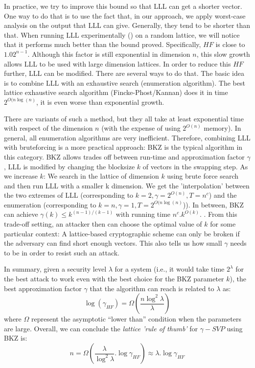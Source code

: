 In practice, we try to improve this bound so that LLL can get a shorter vector. One way
to do that is to use the fact that, in our approach, we apply worst-case analysis
on the output that LLL can give. Generally, they tend to be shorter than
that. When running LLL experimentally (\cite{nguyen2006lll}) on a random lattice, we
will notice that it performs much better than the bound proved. Specifically, $HF$
is close to $1.02^{n-1}$. Although this factor is still exponential in dimension
$n$, this slow growth allows LLL to be used with large dimension lattices. In
order to reduce this $HF$ further, LLL can be modified. There are several
ways to do that. The basic idea is to combine LLL with an exhaustive search
(enumeration algorithm). The best lattice exhaustive search algorithm
(Fincke-Phost/Kannan) does it in time $2^{O(n\log(n)}$, it is even worse than
exponential growth. 

There are variants of such a method, but they all take at least
exponential time with respect of the dimension $n$ (with the expense of using $2^{O(n)}$
memory). In general, all enumeration algorithms are very inefficient. Therefore,
combining LLL with bruteforcing is a more practical approach: BKZ is the typical
algorithm in this category.  BKZ allows trades off between run-time and
approximation factor $\gamma$, LLL is modified by changing the blocksize $k$ of
vectors in the swapping step. As we increase $k$: We search in the lattice of
dimension $k$ using brute force search and then run LLL with a smaller k dimension. We get the 'interpolation' between the two extremes of LLL (corresponding to
$k = 2, \gamma = 2^{O(n)}, T = n^c$) and the enumeration (corresponding to
$k = n, \gamma=1, T = 2^{O(n\log(n)}$)). In between, BKZ can achieve
$\gamma(k) \leq k^{(n-1)/(k-1)}$ with running time
$n^c.k^{O(k)}$. \cite{hanrot2011terminating}. From this trade-off setting, an
attacker then can choose the optimal value of $k$ for some particular context: A
lattice-based cryptographic scheme can only be broken if the adversary can find
short enough vectors. This also tells us how small $\gamma$ needs to be in order
to resist such an attack.

In summary, given a security level $\lambda$ for a system (i.e., it would take
time $2^\lambda$ for the best attack to work even with the best choice for the BKZ
parameter $k$), the best approximation factor $\gamma$ that the
algorithm can reach is related to $\lambda$ as:
\[
  \log(\gamma_{HF}) = \Omega(\frac{n\log^2\lambda}{\lambda})
\]
where $\Omega$ represent the asymptotic ``lower than'' condition when the parameters
are large. Overall, we can conclude the \emph{lattice 'rule of thumb'} for
$\gamma-SVP$ using BKZ is:
\[
  n = \Omega(\frac{\lambda}{\log^2\lambda}.\log\gamma_{HF}) \approx \lambda
  . \log\gamma_{HF}
\]

